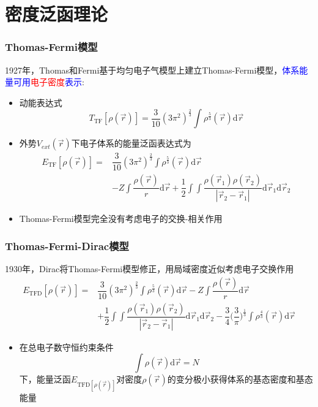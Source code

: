 \documentclass[cjk,slidestop,compress,mathserif,blue]{beamer}
\begin{document}
\section{密度泛函理论}       %
\frame
{
	\frametitle{\textrm{Thomas-Fermi}模型} 
	1927年，\textrm{Thomas}和\textrm{Fermi}基于均匀电子气模型上建立\textrm{Thomas-Fermi}模型，\textcolor{blue}{体系能量可用}\textcolor{red}{电子密度}\textcolor{blue}{表示}:
	\begin{itemize}
		\item 动能表达式
			$$T_{\mathrm{TF}}[\rho(\vec r)]=\dfrac3{10}(3\pi^2)^{\frac23}\int\rho^{\frac53}(\vec r)\mathrm{d}\vec r$$
		\item 外势$V_{ext}(\vec r)$下电子体系的能量泛函表达式为
			\begin{displaymath}
				\begin{aligned}
					E_{\mathrm{TF}}[\rho(\vec r)]=&\dfrac3{10}(3\pi^2)^{\frac23}\int\rho^{\frac53}(\vec r)\mathrm{d}\vec r\\
					&-Z\int\dfrac{\rho(\vec r)}{r}\mathrm{d}\vec r+\dfrac12\int\int\dfrac{\rho(\vec r_1)\rho(\vec r_2)}{|\vec r_2-\vec r_1|}\mathrm{d}\vec r_1\mathrm{d}\vec r_2
				\end{aligned}
			\end{displaymath}
		\item \textrm{Thomas-Fermi}模型完全没有考虑电子的交换-相关作用
	\end{itemize}
}

\frame
{
	\frametitle{\textrm{Thomas-Fermi-Dirac}模型} 
	1930年，\textrm{Dirac}将\textrm{Thomas-Fermi}模型修正，用局域密度近似考虑电子交换作用
			\begin{displaymath}
				\begin{aligned}
					E_{\mathrm{TFD}}[\rho(\vec r)]=&\dfrac3{10}(3\pi^2)^{\frac23}\int\rho^{\frac53}(\vec r)\mathrm{d}\vec r-Z\int\dfrac{\rho(\vec r)}{r}\mathrm{d}\vec r\\
					&+\dfrac12\int\int\dfrac{\rho(\vec r_1)\rho(\vec r_2)}{|\vec r_2-\vec r_1|}\mathrm{d}\vec r_1\mathrm{d}\vec r_2-\dfrac34\bigg(\dfrac3{\pi}\bigg)^{\frac13}\int\rho^{\frac43}(\vec r)\mathrm{d}\vec r
				\end{aligned}
			\end{displaymath}
			\begin{itemize}
				\item 在总电子数守恒约束条件
					$$\int\rho(\vec r)\mathrm{d}\vec r=N$$
					下，能量泛函$E_{\mathrm{TFD}[\rho(\vec r)]}$对密度$\rho(\vec r)$的变分极小获得体系的基态密度和基态能量
			\end{itemize}
}
\end{document}
